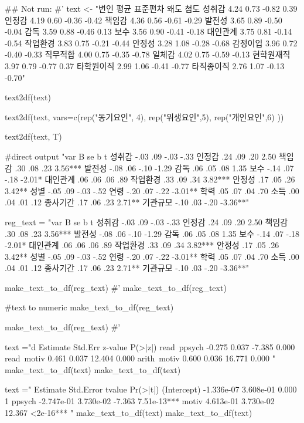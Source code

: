 \documentclass[a4paper]{book}
\begin{document}
\begin{Examples}
\begin{ExampleCode}

## Not run: 
#'
text <- "변인 평균 표준편차 왜도 첨도
성취감 4.24 0.73 -0.82 0.39
인정감 4.19 0.60 -0.36 -0.42
책임감 4.36 0.56 -0.61 -0.29
발전성 3.65 0.89 -0.50 -0.04
감독 3.59 0.88 -0.46 0.13
보수 3.56 0.90 -0.41 -0.18
대인관계 3.75 0.81 -0.14 -0.54
작업환경 3.83 0.75 -0.21 -0.44
안정성 3.28 1.08 -0.28 -0.68
감정이입 3.96 0.72 -0.40 -0.33
직무적합 4.00 0.75 -0.35 -0.78
일체감 4.02 0.75 -0.59 -0.13
현학원재직 3.97 0.79 -0.77 0.37
타학원이직 2.99 1.06 -0.41 -0.77
타직종이직 2.76 1.07 -0.13 -0.70"

text2df(text)

text2df(text, vars=c(rep("동기요인", 4),
              rep("위생요인",5), rep("개인요인",6)  ))

text2df(text, T)%

#direct output
"var B se b t
성취감 -.03 .09 -.03 -.33
인정감 .24 .09 .20 2.50
책임감 .30 .08 .23 3.56***
발전성 -.08 .06 -.10 -1.29
감독 .06 .05 .08 1.35
보수 -.14 .07 -.18 -2.01*
대인관계 .06 .06 .06 .89
작업환경 .33 .09 .34 3.82***
안정성 .17 .05 .26 3.42**
성별 -.05 .09 -.03 -.52
연령 -.20 .07 -.22 -3.01**
학력 .05 .07 .04 .70
소득 .00 .04 .01 .12
종사기간 .17 .06 .23 2.71**
기관규모 -.10 .03 -.20 -3.36**" %

reg_text = "var B se b t
성취감 -.03 .09 -.03 -.33
인정감 .24 .09 .20 2.50
책임감 .30 .08 .23 3.56***
발전성 -.08 .06 -.10 -1.29
감독 .06 .05 .08 1.35
보수 -.14 .07 -.18 -2.01*
대인관계 .06 .06 .06 .89
작업환경 .33 .09 .34 3.82***
안정성 .17 .05 .26 3.42**
성별 -.05 .09 -.03 -.52
연령 -.20 .07 -.22 -3.01**
학력 .05 .07 .04 .70
소득 .00 .04 .01 .12
종사기간 .17 .06 .23 2.71**
기관규모 -.10 .03 -.20 -3.36**"

make_text_to_df(reg_text)
#'
make_text_to_df(reg_text) %

#text to numeric
make_text_to_df(reg_text)%

make_text_to_df(reg_text)%
#'

text ="d           Estimate  Std.Err  z-value  P(>|z|)
  read~ppsych           -0.275    0.037   -7.385    0.000
    read~motiv             0.461    0.037   12.404    0.000
arith~motiv             0.600    0.036   16.771    0.000
"
make_text_to_df(text)
make_text_to_df(text) %

text ="             Estimate Std.Error tvalue Pr(>|t|)
(Intercept) -1.336e-07  3.608e-01   0.000        1
ppsych      -2.747e-01  3.730e-02  -7.363  7.51e-13***
motiv        4.613e-01  3.730e-02  12.367  <2e-16***
"
make_text_to_df(text) %
make_text_to_df(text) %



\end{ExampleCode}
\end{Examples}
\end{document}
